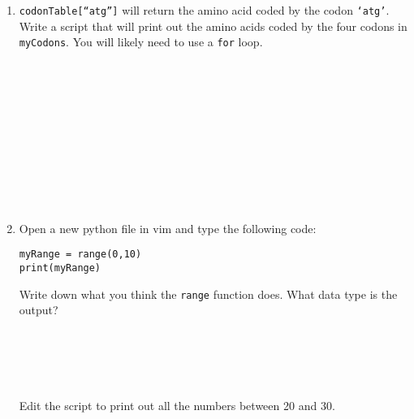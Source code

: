 \documentclass[11pt]{article}
\begin{document}
\begin{enumerate}
\item
  \texttt{codonTable[``atg'']} will return the amino acid coded by the codon \texttt{`atg'}. Write a script that will print out the amino acids coded by the four codons in \texttt{myCodons}. You will likely need to use a \texttt{for} loop.\\
  \\
  \\
  \\
  \\
  \\
  \\
  \\
  \\
  \\
  \\
\item Open a new python file in vim and type the following code:
\begin{verbatim}
myRange = range(0,10)
print(myRange)
\end{verbatim}
Write down what you think the \texttt{range} function does. What data type is the output?\\
\\
\\
\\
\\
\\
Edit the script to print out all the numbers between 20 and 30.
\\
\end{enumerate}
\end{document}
